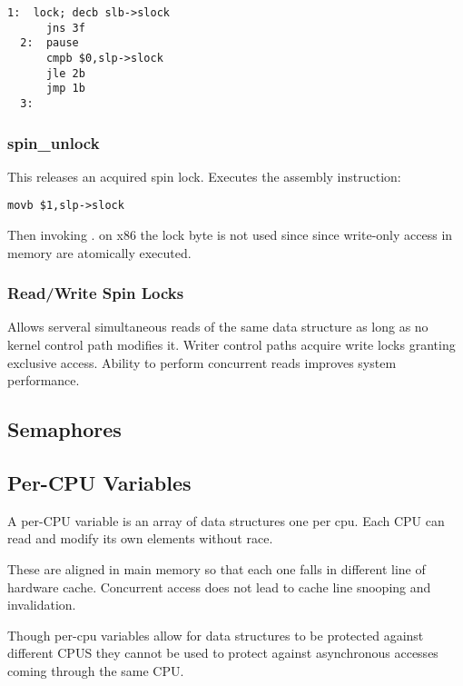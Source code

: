 \documentclass{article}
\begin{document}
\begin{lstlisting}[language=anX86]
  1:  lock; decb slb->slock
      jns 3f
  2:  pause
      cmpb $0,slp->slock
      jle 2b
      jmp 1b
  3: 
\end{lstlisting}

\subsubsection{spin\_unlock}

This releases an acquired spin lock. Executes the assembly instruction:


\begin{lstlisting}[language=anX86]
  movb $1,slp->slock
\end{lstlisting}

Then invoking . on x86 the lock byte is
not used since since write-only access in memory are atomically
executed.

\subsubsection{Read/Write Spin Locks}

Allows serveral simultaneous reads of the same data structure as long
as no kernel control path modifies it. Writer control paths acquire
write locks granting exclusive access. Ability to perform concurrent
reads improves system performance.

\subsection{Semaphores}




\subsection{Per-CPU Variables}

A per-CPU variable is an array of data structures one per cpu. Each CPU
can read and modify its own elements without race.

These are aligned in main memory so that each one falls in different
line of hardware cache. Concurrent access does not lead to cache line
snooping and invalidation.

Though per-cpu variables allow for data structures to be protected
against different CPUS they cannot be used to protect against
asynchronous accesses coming through the same CPU.
\end{document}

